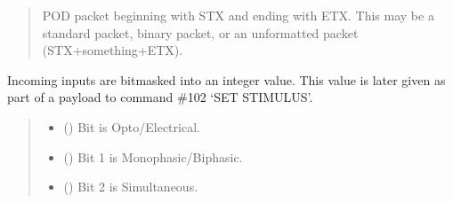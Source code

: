 \documentclass[letterpaper,10pt,english]{sphinxmanual}
\begin{document}
\begin{fulllineitems}
\begin{fulllineitems}
\begin{quote}
\begin{description}
\begin{itemize}
\end{itemize}

\sphinxAtStartPar
POD packet beginning with STX and ending with ETX. This may be a                 standard packet, binary packet, or an unformatted packet (STX+something+ETX).

\sphinxAtStartPar
{\hyperref[\detokenize{Morelia.Packets:Morelia.Packets.Packet.Packet}]{}}

\end{description}\end{quote}

\end{fulllineitems}


\begin{fulllineitems}
\label{\detokenize{Morelia.Devices:Morelia.Devices.PodDevice_8480SC.Pod8480SC.StimulusConfigBits}}
\pysigstartsignatures
{}
\pysigstopsignatures
\sphinxAtStartPar
Incoming inputs are bitmasked into an integer value. This value is later given as part of a payload         to command \#102 ‘SET STIMULUS’.
\begin{quote}\begin{description}
\begin{itemize}
\item {} 
\sphinxAtStartPar
{} () \textendash{} Bit  is Opto/Electrical.

\item {} 
\sphinxAtStartPar
{} () \textendash{} Bit 1 is Monophasic/Biphasic.

\item {} 
\sphinxAtStartPar
{} () \textendash{} Bit 2 is Simultaneous.


\end{itemize}
\end{description}
\end{quote}
\end{fulllineitems}
\end{fulllineitems}
\end{document}
